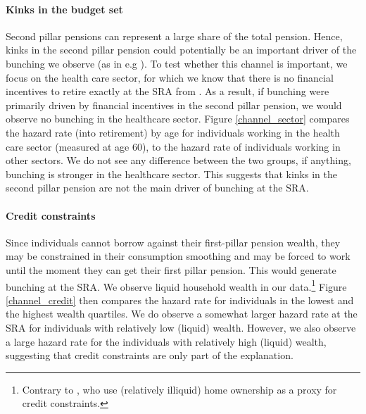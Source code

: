 \documentclass[12pt,a4paper]{article}
\begin{document}
\paragraph{Kinks in the budget set} Second pillar pensions can represent a large share of the total pension. Hence, kinks in the second pillar pension could potentially be an important driver of the bunching we observe (as in e.g \cite{Brown2013}). To test whether this channel is important, we focus on the health care sector, for which we know that there is no financial incentives to retire exactly at the SRA from \citet{kantarci_what_2020}. As a result, if bunching were primarily driven by financial incentives in the second pillar pension, we would observe no bunching in the healthcare sector. %
Figure \ref{channel_sector} compares the hazard rate (into retirement) by age for individuals working in the health care sector (measured at age 60), to the hazard rate of individuals working in other sectors. We do not see any difference between the two groups, if anything, bunching is stronger in the healthcare sector. This suggests that kinks in the second pillar pension are not the main driver of bunching at the SRA. 

\paragraph{Credit constraints} Since individuals cannot borrow against their first-pillar pension wealth, they may be constrained in their consumption smoothing and may be forced to work until the moment they can get their first pillar pension. This would generate bunching at the SRA. We observe liquid household wealth in our data.\footnote{Contrary to \citet{cribb2016signals}, who use (relatively illiquid) home ownership as a proxy for credit constraints.} Figure \ref{channel_credit} then compares the hazard rate for individuals in the lowest and the highest wealth quartiles. We do observe a somewhat larger hazard rate at the SRA for individuals with relatively low (liquid) wealth. However, we also observe a large hazard rate for the individuals with relatively high (liquid) wealth, suggesting that credit constraints are only part of the explanation. 
\end{document}
